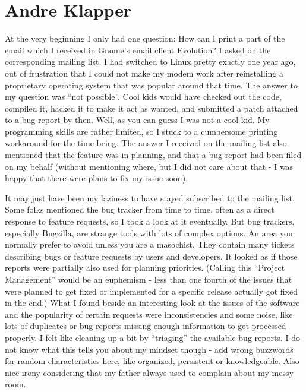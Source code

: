 \chapter{Andre Klapper}
At the very beginning I only had one question: How can I print a part of the email which I received in Gnome's email client Evolution? I asked on the corresponding mailing list.
I had switched to Linux pretty exactly one year ago, out of frustration that I could not make my modem work after reinstalling a proprietary operating system that was popular around that time.
The answer to my question was ``not possible''. Cool kids would have checked out the code, compiled it, hacked it to make it act as wanted, and submitted a patch attached to a bug report by then. Well, as you can guess I was not a cool kid. My programming skills are rather limited, so I stuck to a cumbersome printing workaround for the time being. The answer I received on the mailing list also mentioned that the feature was in planning, and that a bug report had been filed on my behalf (without mentioning where, but I did not care about that - I was happy that there were plans to fix my issue soon).

It may just have been my laziness to have stayed subscribed to the mailing list. Some folks mentioned the bug tracker from time to time, often as a direct response to feature requests, so I took a look at it eventually. But bug trackers, especially Bugzilla, are strange tools with lots of complex options. An area you normally prefer to avoid unless you are a masochist. They contain many tickets describing bugs or feature requests by users and developers. It looked as if those reports were partially also used for planning priorities. (Calling this ``Project Management'' would be an euphemism - less than one fourth of the issues that were planned to get fixed or implemented for a specific release actually got fixed in the end.)
What I found beside an interesting look at the issues of the software and the popularity of certain requests were inconsistencies and some noise, like lots of duplicates or bug reports missing enough information to get processed properly. I felt like cleaning up a bit by ``triaging'' the available bug reports. I do not know what this tells you about my mindset though - add wrong buzzwords for random characteristics here, like organized, persistent or knowledgeable. Also nice irony considering that my father always used to complain about my messy room.


